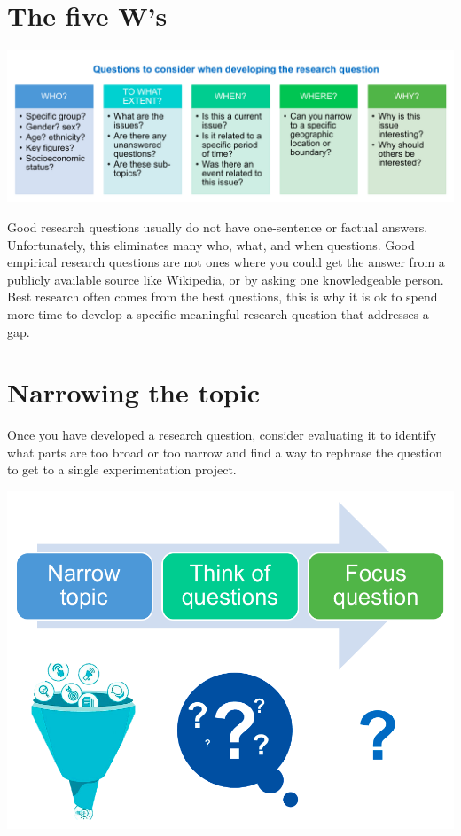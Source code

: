 \documentclass[openany]{book}
\begin{document}
\hypertarget{the-five-ws}{%
\section{The five W's}\label{the-five-ws}}

\includegraphics{fig/5ws.png}

Good research questions usually do not have one-sentence or factual answers. Unfortunately, this eliminates many who, what, and when questions. Good empirical research questions are not ones where you could get the answer from a publicly available source like Wikipedia, or by asking one knowledgeable person. Best research often comes from the best questions, this is why it is ok to spend more time to develop a specific meaningful research question that addresses a gap.

\hypertarget{narrowing-the-topic}{%
\section{Narrowing the topic}\label{narrowing-the-topic}}

Once you have developed a research question, consider evaluating it to identify what parts are too broad or too narrow and find a way to rephrase the question to get to a single experimentation project.

\includegraphics{fig/narrow-question.png}
\end{document}
